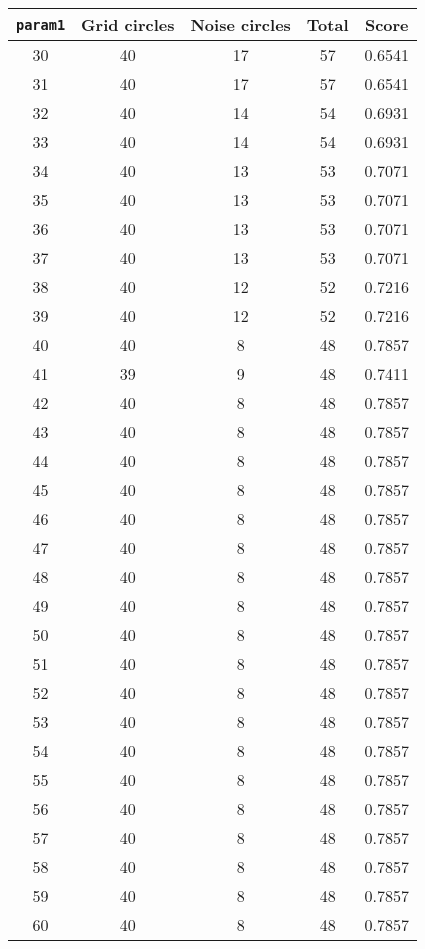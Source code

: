 \documentclass[letterpaper, 12pt]{article}
\begin{document}
\begin{longtable}{|c|c|c|c|c|}
\hline
\textbf{\texttt{param1}} & \textbf{Grid circles} & \textbf{Noise circles} & \textbf{Total} & \textbf{Score} \\
\hline
30 & 40 & 17 & 57 & 0.6541 \\
\hline
31 & 40 & 17 & 57 & 0.6541 \\
\hline
32 & 40 & 14 & 54 & 0.6931 \\
\hline
33 & 40 & 14 & 54 & 0.6931 \\
\hline
34 & 40 & 13 & 53 & 0.7071 \\
\hline
35 & 40 & 13 & 53 & 0.7071 \\
\hline
36 & 40 & 13 & 53 & 0.7071 \\
\hline
37 & 40 & 13 & 53 & 0.7071 \\
\hline
38 & 40 & 12 & 52 & 0.7216 \\
\hline
39 & 40 & 12 & 52 & 0.7216 \\
\hline
40 & 40 & 8 & 48 & 0.7857 \\
\hline
41 & 39 & 9 & 48 & 0.7411 \\
\hline
42 & 40 & 8 & 48 & 0.7857 \\
\hline
43 & 40 & 8 & 48 & 0.7857 \\
\hline
44 & 40 & 8 & 48 & 0.7857 \\
\hline
45 & 40 & 8 & 48 & 0.7857 \\
\hline
46 & 40 & 8 & 48 & 0.7857 \\
\hline
47 & 40 & 8 & 48 & 0.7857 \\
\hline
48 & 40 & 8 & 48 & 0.7857 \\
\hline
49 & 40 & 8 & 48 & 0.7857 \\
\hline
50 & 40 & 8 & 48 & 0.7857 \\
\hline
51 & 40 & 8 & 48 & 0.7857 \\
\hline
52 & 40 & 8 & 48 & 0.7857 \\
\hline
53 & 40 & 8 & 48 & 0.7857 \\
\hline
54 & 40 & 8 & 48 & 0.7857 \\
\hline
55 & 40 & 8 & 48 & 0.7857 \\
\hline
56 & 40 & 8 & 48 & 0.7857 \\
\hline
57 & 40 & 8 & 48 & 0.7857 \\
\hline
58 & 40 & 8 & 48 & 0.7857 \\
\hline
59 & 40 & 8 & 48 & 0.7857 \\
\hline
60 & 40 & 8 & 48 & 0.7857 \\
\hline

\end{longtable}
\end{document}
